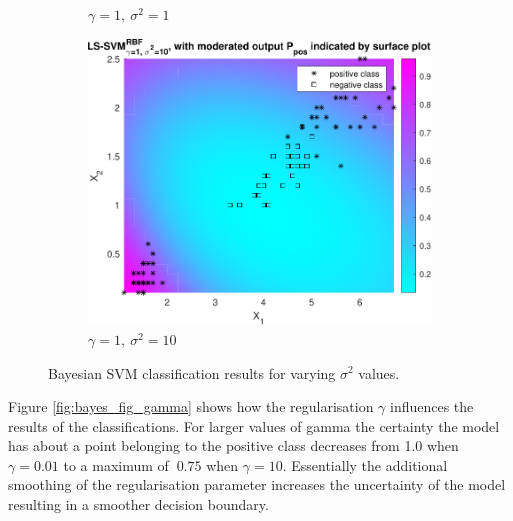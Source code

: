 \documentclass{article}
\begin{document}
\begin{figure}[h]
\begin{subfigure}[b]{0.3\textwidth}
                    \caption{$\gamma = 1, \ \sigma^2 = 1$}
                     \label{fig:bayes_2}
                 \end{subfigure}
                 \hfill
                 \begin{subfigure}[b]{0.3\textwidth}
                     \centering
                     \includegraphics[width=\textwidth]{Assignment 1/figures/bayes_rbf_gamma_1_sig2_10.pdf}
                    \caption{$\gamma = 1, \ \sigma^2 = 10$}
                     \label{fig:bayes_3}
                 \end{subfigure}
                \caption{Bayesian SVM classification results for varying $\sigma^2$ values.}
                \label{fig:bayes_fig_sigma}
            \end{figure}
            
            Figure \ref{fig:bayes_fig_gamma} shows how the regularisation $\gamma$ influences the results of the classifications. For larger values of gamma the certainty the model has about a point belonging to the positive class decreases from 1.0 when $\gamma = 0.01$ to a maximum of $~0.75$ when $\gamma=10$. Essentially the additional smoothing of the regularisation parameter increases the uncertainty of the model resulting in a smoother decision boundary. 
            
\end{document}
